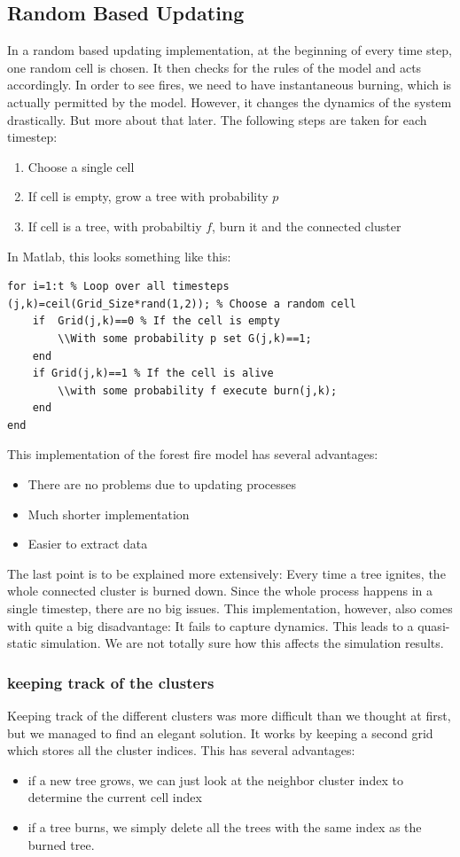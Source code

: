 \documentclass[11pt]{article}
\begin{document}
\subsection{Random Based Updating}
In a random based updating implementation, at the beginning of every time step, one random cell is chosen. It then checks for the rules of the model and acts accordingly. In order to see fires, we need to have instantaneous burning, which is actually permitted by the model. However, it changes the dynamics of the system drastically. But more about that later. The following steps are taken for each timestep:

\begin{enumerate}
\item Choose a single cell
\item If cell is empty, grow a tree with probability $p$
\item If cell is a tree, with probabiltiy $f$, burn it and the connected cluster
\end{enumerate}
In Matlab, this looks something like this:

\begin{verbatim}
for i=1:t % Loop over all timesteps
(j,k)=ceil(Grid_Size*rand(1,2)); % Choose a random cell
	if  Grid(j,k)==0 % If the cell is empty
		\\With some probability p set G(j,k)==1;
	end
	if Grid(j,k)==1 % If the cell is alive
		\\with some probability f execute burn(j,k);
	end
end
\end{verbatim}

This implementation of the forest fire model has several advantages:
\begin{itemize}
\item There are no problems due to updating processes
\item Much shorter implementation
\item Easier to extract data
\end{itemize}
The last point is to be explained more extensively: Every time a tree ignites, the whole connected cluster is burned down. Since the whole process happens in a single timestep, there are no big issues.
This implementation, however, also comes with quite a big disadvantage: It fails to capture dynamics. This leads to a quasi-static simulation. We are not totally sure how this affects the simulation results.

\subsubsection{keeping track of the clusters}
Keeping track of the different clusters was more difficult than we thought at first, but we managed to find an elegant solution. It works by keeping a second grid which stores all the cluster indices. This has several advantages:
\begin{itemize}
\item if a new tree grows, we can just look at the neighbor cluster index to determine the current cell index
\item if a tree burns, we simply delete all the trees with the same index as the burned tree.
\end {itemize}
\end{document}
